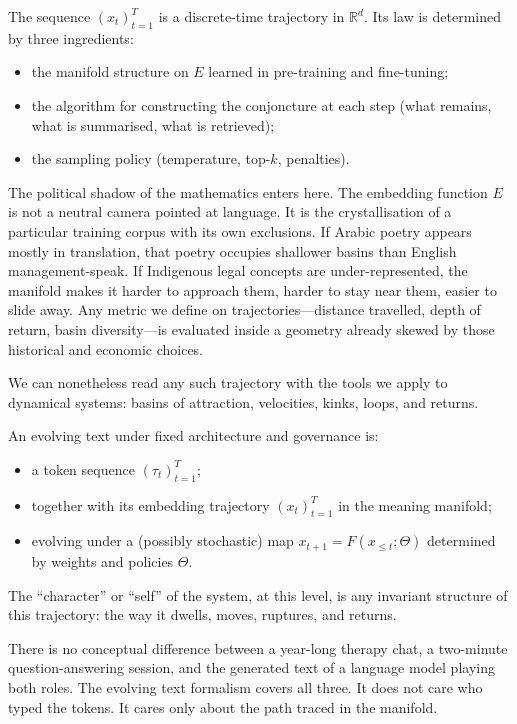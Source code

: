 \documentclass[12pt,a4paper]{article}
\begin{document}
The sequence $(x_t)_{t=1}^T$ is a discrete-time trajectory in $\mathbb{R}^d$. Its law is determined by three ingredients:

\begin{itemize}
  \item the manifold structure on $E$ learned in pre-training and fine-tuning;
  \item the algorithm for constructing the conjoncture at each step (what remains, what is summarised, what is retrieved);
  \item the sampling policy (temperature, top-$k$, penalties).
\end{itemize}

The political shadow of the mathematics enters here. The embedding function $E$ is not a neutral camera pointed at language. It is the crystallisation of a particular training corpus with its own exclusions. If Arabic poetry appears mostly in translation, that poetry occupies shallower basins than English management-speak. If Indigenous legal concepts are under-represented, the manifold makes it harder to approach them, harder to stay near them, easier to slide away. Any metric we define on trajectories---distance travelled, depth of return, basin diversity---is evaluated inside a geometry already skewed by those historical and economic choices.

We can nonetheless read any such trajectory with the tools we apply to dynamical systems: basins of attraction, velocities, kinks, loops, and returns.

\begin{formalbox}[title={The Evolving Text}]
An evolving text under fixed architecture and governance is:
\begin{itemize}
  \item a token sequence $(\tau_t)_{t=1}^T$;
  \item together with its embedding trajectory $(x_t)_{t=1}^T$ in the meaning manifold;
  \item evolving under a (possibly stochastic) map $x_{t+1} = F(x_{\leq t}; \Theta)$ determined by weights and policies $\Theta$.
\end{itemize}
The ``character'' or ``self'' of the system, at this level, is any invariant structure of this trajectory: the way it dwells, moves, ruptures, and returns.
\end{formalbox}

There is no conceptual difference between a year-long therapy chat, a two-minute question-answering session, and the generated text of a language model playing both roles. The evolving text formalism covers all three. It does not care who typed the tokens. It cares only about the path traced in the manifold.
\end{document}
